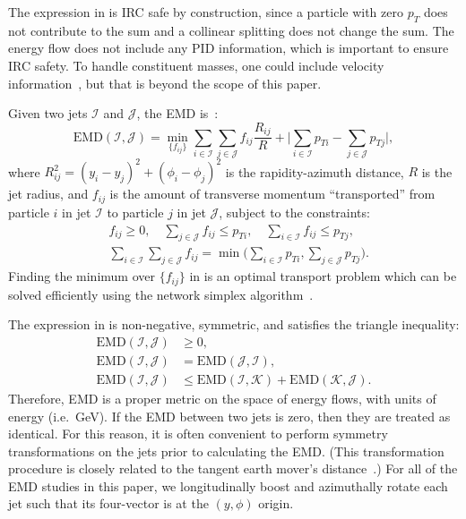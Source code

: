 \documentclass[aps,prd,twocolumn,preprintnumbers,nofootinbib,longbibliography,floatfix,superscriptaddress]{revtex4-1}
\begin{document}
The expression in  is IRC safe by construction, since a particle with zero $p_T$ does not contribute to the sum and a collinear splitting does not change the sum.
%
The energy flow does not include any PID information, which is important to ensure IRC safety.
%
To handle constituent masses, one could include velocity information~\cite{Mateu:2012nk}, but that is beyond the scope of this paper.


Given two jets $\mathcal{I}$ and $\mathcal{J}$, the EMD is~\cite{Komiske:2019fks}:
\begin{equation}
\label{eq:EMD}
\text{EMD}(\mathcal{I}, \mathcal{J}) = \min_{\{f_{ij}\}} \sum_{i \in \mathcal{I}} \sum_{j \in \mathcal{J}} f_{ij} \frac{R_{ij}}{R} + \bigg| \sum_{i \in \mathcal{I}} p_{Ti} - \sum_{j \in \mathcal{J}} p_{Tj}  \bigg|,
\end{equation}
where $R_{ij}^2 = (y_i - y_j)^2 + (\phi_i - \phi_j)^2$ is the rapidity-azimuth distance, $R$ is the jet radius, and $f_{ij}$ is the amount of transverse momentum ``transported'' from particle $i$ in jet $\mathcal I$ to particle $j$ in jet $\mathcal J$, subject to the constraints:
\begin{align}
&f_{ij} \ge 0, \quad \sum_{j \in \mathcal{J}} f_{ij} \leq p_{Ti}, \quad \sum_{i \in \mathcal{I}} f_{ij} \leq p_{Tj},
\label{eq:EMDconstraints}\\
&\sum_{i \in \mathcal{I}} \sum_{j \in \mathcal{J}} f_{ij} = \min \bigg( \sum_{i \in \mathcal{I}} p_{Ti}, \sum_{j \in \mathcal{J}} p_{Tj}  \bigg).
\end{align}
%
Finding the minimum over $\{f_{ij}\}$ in  is an optimal transport problem which can be solved efficiently using the network simplex algorithm~\cite{DBLP:journals/mp/Orlin97,DBLP:journals/mp/Tarjan97,DBLP:journals/mp/OrlinPT93}.


The expression in  is non-negative, symmetric, and satisfies the triangle inequality:
%
\begin{align}
\text{EMD}(\mathcal{I}, \mathcal{J}) &\ge 0, \nonumber\\
\text{EMD}(\mathcal{I}, \mathcal{J}) &= \text{EMD}(\mathcal{J}, \mathcal{I}), \nonumber \\
\text{EMD}(\mathcal{I}, \mathcal{J}) &\leq \text{EMD}(\mathcal{I}, \mathcal{\mathcal{K}}) + \text{EMD}(\mathcal{K},\mathcal{J}) \label{eq:EMDproperties}.
\end{align}
%
Therefore, EMD is a proper metric on the space of energy flows, with units of energy (i.e.\ GeV).
%
If the EMD between two jets is zero, then they are treated as identical.
%
For this reason, it is often convenient to perform symmetry transformations on the jets prior to calculating the EMD.
%
(This transformation procedure is closely related to the tangent earth mover's distance~\cite{temd}.)
%
For all of the EMD studies in this paper, we longitudinally boost and azimuthally rotate each jet such that its four-vector is at the $(y,\phi)$ origin.
\end{document}
